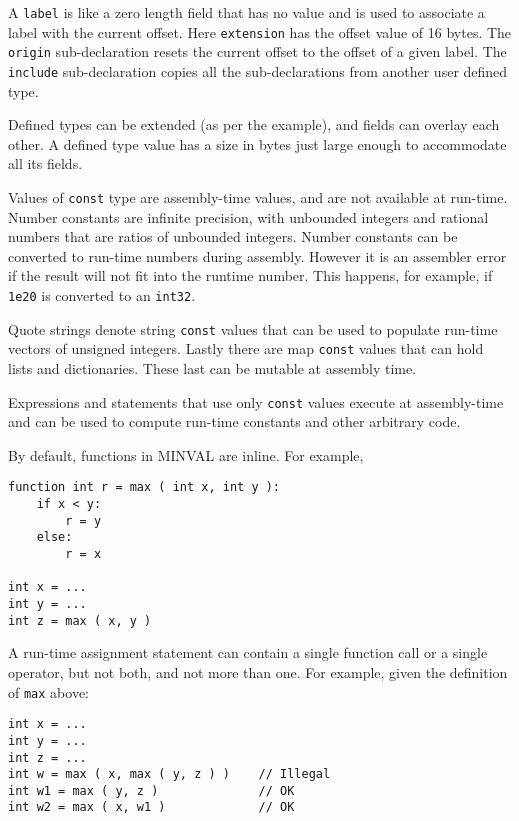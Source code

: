 \documentclass[12pt]{article}
\newenvironment{indpar}[1][0.3in]%
	{\begin{list}{}%
		     {\setlength{\itemsep}{0in}%
		      \setlength{\topsep}{0in}%
		      \setlength{\parsep}{1ex}%
		      \setlength{\labelwidth}{#1}%
		      \setlength{\leftmargin}{#1}%
		      \addtolength{\leftmargin}{\labelsep}}%
	 \item}%
	{\end{list}}
\begin{document}
A {\tt label} is like a zero length field that has no value and
is used to associate a label with the current offset.
Here {\tt extension} has the offset value of 16 bytes.
The {\tt origin} sub-declaration resets the current offset to the offset
of a given label.
The {\tt include} sub-declaration copies all the sub-declarations
from another user defined type.

Defined types can be extended
(as per the example), and fields can overlay each other.
A defined type value has a size in bytes just large enough to
accommodate all its fields.

Values of {\tt const} type are assembly-time values, and are
not available at run-time.  Number constants are infinite
precision, with unbounded integers and rational numbers that
are ratios of unbounded integers.  Number constants
can be converted to run-time numbers during assembly.
However it is an assembler error
if the result will not fit into the runtime number.
This happens, for example, if {\tt 1e20}
is converted to an {\tt int32}.

Quote strings denote string {\tt const} values that can be
used to populate run-time vectors of unsigned integers.
Lastly there are map {\tt const} values that can hold lists
and dictionaries.  These last can be mutable at assembly time.

Expressions and statements that use only {\tt const} values
execute at assembly-time and can be used to compute run-time
constants and other arbitrary code.

By default, functions in MINVAL are inline.  For example,

\begin{indpar}\begin{verbatim}
function int r = max ( int x, int y ):
    if x < y:
        r = y
    else:
        r = x

int x = ...
int y = ...
int z = max ( x, y )
\end{verbatim}\end{indpar}

A run-time assignment statement can contain a single function call
or a single operator, but not both, and not more than one.
For example, given the definition of {\tt max} above:

\begin{indpar}\begin{verbatim}
int x = ...
int y = ...
int z = ...
int w = max ( x, max ( y, z ) )    // Illegal
int w1 = max ( y, z )              // OK
int w2 = max ( x, w1 )             // OK
\end{verbatim}\end{indpar}
\end{document}
